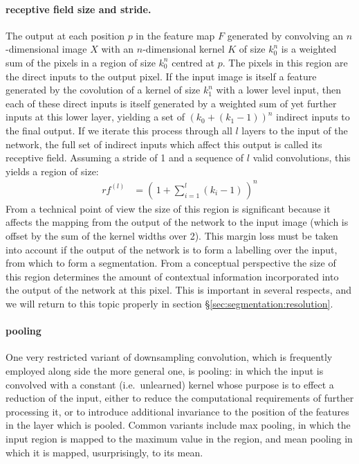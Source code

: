 \documentclass[msc]{infthesis}
\newcommand{\of}[1]{\left(\,{#1}\,\right)}
\begin{document}
\paragraph*{receptive field size and stride.}
%
The output at each position \(p\) in the feature map \(F\) generated by convolving an
\(n\)-dimensional image \(X\) with an \(n\)-dimensional kernel \(K\) of size \(k_0^n\) is a
weighted sum of the pixels in a region of size \(k_0^n\) centred at \(p\).  The pixels in this
region are the direct inputs to the output pixel.  If the input image is itself a feature
generated by the covolution of a kernel of size \(k_1^n\) with a lower level input, then each of
these direct inputs is itself generated by a weighted sum of yet further inputs at this lower
layer, yielding a set of \((k_0 + (k_1- 1))^n\) indirect inputs to the final output.  If we
iterate this process through all \(l\) layers to the input of the network, the full set of
indirect inputs which affect this output is called its receptive field.  Assuming a stride of
1 and a sequence of \(l\) valid convolutions, this yields a region of size:
%
\begin{align}
  \label{eq:receptive-field}
  rf^{(l)}
  &=
    \of{ 1 + \sum_{i = 1}^{l} (k_i - 1) }^n
\end{align}
%
From a technical point of view the size of this region is significant because it affects the
mapping from the output of the network to the input image (which is offset by the sum of the
kernel widths over 2).  This margin loss must be taken into account if the output of the network
is to form a labelling over the input, from which to form a segmentation.
%
From a conceptual perspective the size of this region determines the amount of contextual
information incorporated into the output of the network at this pixel.  This is important in
several respects, and we will return to this topic properly in section
\S\ref{sec:segmentation:resolution}.



\paragraph*{pooling}
%
One very restricted variant of downsampling convolution, which is frequently employed along side
the more general one, is pooling: in which the input is convolved with a constant (i.e.\ unlearned)
kernel whose purpose is to effect a reduction of the input, either to reduce the computational
requirements of further processing it, or to introduce additional invariance to the position of
the features in the layer which is pooled.  Common variants include max pooling, in which the
input region is mapped to the maximum value in the region, and mean pooling in which it is mapped,
usurprisingly, to its mean.
\end{document}
